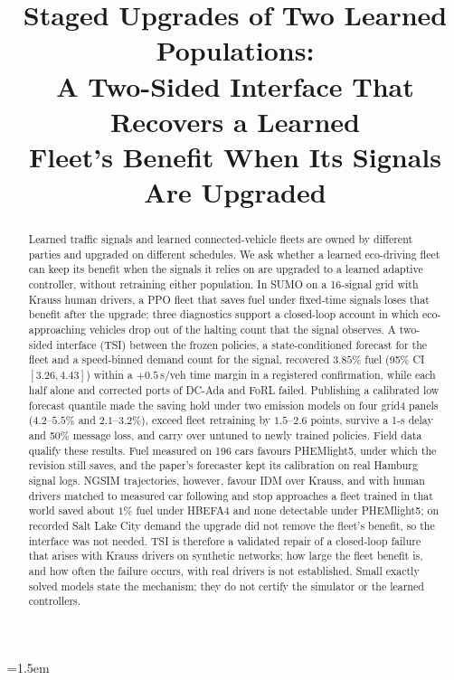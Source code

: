 
\usepackage{multirow}
\usepackage[section]{placeins}
\renewcommand{\topfraction}{0.9}\renewcommand{\dbltopfraction}{0.9}\renewcommand{\floatpagefraction}{0.6}\renewcommand{\dblfloatpagefraction}{0.6}
\setcounter{totalnumber}{5}\setcounter{dbltopnumber}{3}
\emergencystretch=1.5em



\title{Staged Upgrades of Two Learned Populations:\\
A Two-Sided Interface That Recovers a Learned\\
Fleet's Benefit When Its Signals Are Upgraded}

\author{
}

\maketitle

\begin{abstract}
Learned traffic signals and learned connected-vehicle fleets are owned by different parties and upgraded on different schedules. We ask
whether a learned eco-driving fleet can keep its benefit when the signals it relies on are upgraded to a learned adaptive controller,
without retraining either population. In SUMO on a 16-signal grid with Krauss human drivers, a PPO fleet that saves fuel under fixed-time
signals loses that benefit after the upgrade; three diagnostics support a closed-loop account in which eco-approaching vehicles drop out of
the halting count that the signal observes. A two-sided interface (TSI) between the frozen policies, a state-conditioned forecast for the
fleet and a speed-binned demand count for the signal, recovered $3.85\%$ fuel (95\% CI $[3.26, 4.43]$) within a $+0.5$\,s/veh time margin in a
registered confirmation, while each half alone and corrected ports of DC-Ada and FoRL failed. Publishing a calibrated low forecast quantile
made the saving hold under two emission models on four grid4 panels ($4.2$--$5.5\%$ and $2.1$--$3.2\%$), exceed fleet retraining by
$1.5$--$2.6$ points, survive a 1-s delay and 50\% message loss, and carry over untuned to newly trained policies. Field data qualify these
results. Fuel measured on 196 cars favours PHEMlight5, under which the revision still saves, and the paper's forecaster kept its
calibration on real Hamburg signal logs. NGSIM trajectories, however, favour IDM over Krauss, and with human drivers matched to measured car
following and stop approaches a fleet trained in that world saved about $1\%$ fuel under HBEFA4 and none detectable under PHEMlight5; on
recorded Salt Lake City demand the upgrade did not remove the fleet's benefit, so the interface was not needed. TSI is therefore a validated
repair of a closed-loop failure that arises with Krauss drivers on synthetic networks; how large the fleet benefit is, and how often the
failure occurs, with real drivers is not established. Small exactly solved models state the mechanism; they do not certify the simulator
or the learned controllers.
\end{abstract}

